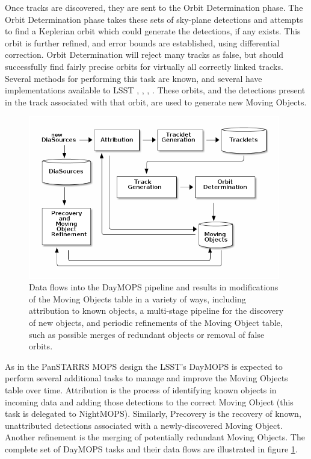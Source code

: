 \documentclass[12pt,preprint]{aastex}
\begin{document}
Once tracks are discovered, they are sent to the Orbit Determination
phase. The Orbit Determination phase takes these sets of sky-plane
detections and attempts to find a Keplerian orbit which could generate
the detections, if any exists.  This orbit is further refined, and
error bounds are established, using differential correction.  Orbit
Determination will reject many tracks as false, but should
successfully find fairly precise orbits for virtually all correctly
linked tracks.  Several methods for performing this task are known,
and several have implementations available to LSST
\citep{Milani04orbitdetermination}, \citep{Milani2006},
\citep{OpenOrb2009}, \citep{granvik_thesis}.  These orbits, and the
detections present in the track associated with that orbit, are used
to generate new Moving Objects.

\begin{figure}[h]
\begin{center}
  \includegraphics[width=11cm]{illustrations/mopsDiagram.png}
\end{center}
\caption{ Data flows into the DayMOPS pipeline and results in
  modifications of the Moving Objects table in a variety of ways,
  including attribution to known objects, a multi-stage pipeline for
  the discovery of new objects, and periodic refinements of the Moving
  Object table, such as possible merges of redundant objects or
  removal of false orbits. }
\label{mopsDiagram}
\end{figure}



As in the PanSTARRS MOPS design \citep{psMOPSDesign} the LSST's
DayMOPS is expected to perform several additional tasks to manage and
improve the Moving Objects table over time.  Attribution is the
process of identifying known objects in incoming data and adding those
detections to the correct Moving Object (this task is delegated to
NightMOPS). Similarly, Precovery is the recovery of known,
unattributed detections associated with a newly-discovered Moving
Object.  Another refinement is the merging of potentially redundant
Moving Objects.  The complete set of DayMOPS tasks and their data
flows are illustrated in figure \ref{mopsDiagram}.
\end{document}
